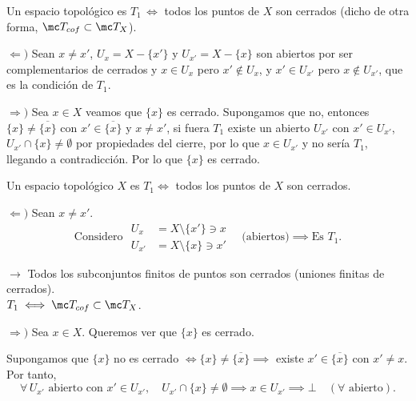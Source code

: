 \begin{prop}
    Un espacio topol\'ogico es $T_1 \, \iff $ todos los puntos de $X$ son cerrados (dicho de otra forma, $\mc T_{cof} \subset \mc T_X$). 
\end{prop}
\begin{dem}
$\Leftarrow) $ Sean $x\neq x'$, $U_x = X- \{x'\}$ y $U_{x'} = X - \{x\}$ son abiertos por ser complementarios de cerrados y $x\in U_x$ pero $x'\nin U_x$, y $x'\in U_{x'}$ pero $x\nin U_{x'}$, que es la condici\'on de $T_1$.

$\Rightarrow)$ Sea $x\in X$ veamos que $\{x\}$ es cerrado. Supongamos que no, entonces $\{x\} \neq \overline{\{x\}}$ con $x'\in \overline{\{x\}}$ y $x\neq x'$, si fuera $T_1$ existe un abierto $U_{x'}$ con $x'\in U_{x'}$, $U_{x'}\cap \{x\} \neq \emptyset$ por propiedades del cierre, por lo que $x \in U_{x'}$ y no ser\'ia $T_1$, llegando a contradicci\'on. Por lo que $\{x\}$ es cerrado. 
\end{dem}

 

\begin{prop}
    Un espacio topológico $X$ es $T_1 \iff$ todos los puntos de $X$ son cerrados.
\end{prop}

\begin{dem} $\Leftarrow)$ Sean $x \ne x'$.
        \[
            \text{Considero } 
            \begin{aligned}
                U_x &= X \setminus \{x'\} \ni x \\
                U_{x'} &= X \setminus \{x\} \ni x'
            \end{aligned}
            \quad \text{(abiertos)} \implies \text{Es } T_1.
        \]
        \begin{flushright}
            \footnotesize
            $\rightarrow$ Todos los subconjuntos finitos de puntos son cerrados (uniones finitas de cerrados). \\
            $T_1 \iff \mc T_{cof} \subset \mc T_X$.
        \end{flushright}

        $\Rightarrow)$ Sea $x \in X$. Queremos ver que $\{x\}$ es cerrado.
        
        Supongamos que $\{x\}$ no es cerrado $\iff \{x\} \ne \overline{\{x\}} \implies$ existe $x' \in \overline{\{x\}}$ con $x' \ne x$. Por tanto, 
        \[
            \forall \, U_{x'} \text{ abierto con } x' \in U_{x'}, \quad U_{x'} \cap \{x\} \ne \emptyset \implies x \in U_{x'} \implies \bot \quad (\forall \text{ abierto}).
        \]
\end{dem}

